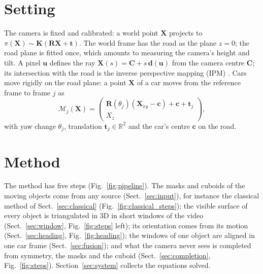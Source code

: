 \documentclass[runningheads,a4paper]{llncs}
\newcommand{\R}{\mathbb{R}}
\newcommand{\vect}[1]{\mathbf{#1}}
\begin{document}
\section{Setting}\label{sec:setting}

The camera is fixed and calibrated: a world point $\vect{X}$ projects to $\pi(\vect{X}) \sim \vect{K}(\vect{R}\vect{X} +
\vect{t})$. The world frame has the road as the plane $z = 0$; the road plane is fitted once, which amounts to measuring
the camera's height and tilt. A pixel $\vect{u}$ defines the ray
$\vect{X}(s) = \vect{C} + s\,\vect{d}(\vect{u})$ from the camera centre $\vect{C}$; its intersection with the road
is the inverse perspective mapping (IPM) \cite{mallot}. Cars move rigidly on the road plane: a point $\vect{X}$ of a
car moves from the reference frame to frame $j$ as
\begin{equation}
  \mathcal{M}_j(\vect{X}) = \begin{pmatrix} \vect{R}(\theta_j)(\vect{X}_{xy} - \vect{c}) + \vect{c} + \vect{t}_j \\ X_z \end{pmatrix},
  \label{eq:motion}
\end{equation}
with yaw change $\theta_j$, translation $\vect{t}_j \in \R^2$ and the car's centre $\vect{c}$ on the road.

\section{Method}

The method has five steps (Fig.~\ref{fig:pipeline}). The masks and cuboids of the moving objects come from any source (Sect.~\ref{sec:input}), for instance the
classical method of Sect.~\ref{sec:classical} (Fig.~\ref{fig:classical_steps}); the visible surface of every object is triangulated in
3D in short windows of the video (Sect.~\ref{sec:window}, Fig.~\ref{fig:steps} left); its orientation comes from
its motion (Sect.~\ref{sec:heading}, Fig.~\ref{fig:heading}); the windows of one object are aligned in one car frame (Sect.~\ref{sec:fusion}); and what the camera never sees is completed from symmetry, the masks and the
cuboid (Sect.~\ref{sec:completion}, Fig.~\ref{fig:steps}). Section~\ref{sec:system} collects the equations solved.
\end{document}

